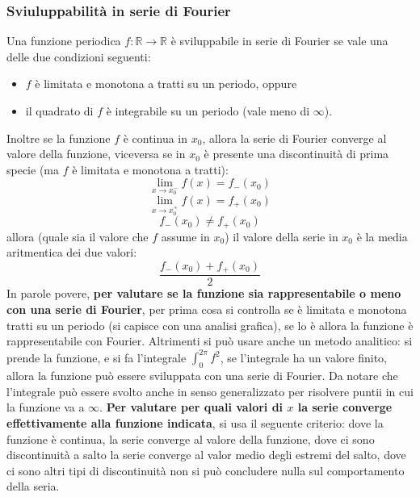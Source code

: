\subsubsection{Sviuluppabilità in serie di Fourier}
Una funzione periodica $f: \mathbb{R} \rightarrow  \mathbb{R}$ è sviluppabile in serie di Fourier se vale una delle due condizioni seguenti:
\begin{itemize}
    \item $f$ è limitata e monotona a tratti su un periodo, oppure
    \item il quadrato di $f$ è integrabile su un periodo (vale meno di $\infty$).
\end{itemize}
Inoltre se la funzione $f$ è continua in $x_0$, allora la serie di Fourier converge al valore della funzione, viceversa se in $x_0$ è presente una discontinuità di prima specie (ma $f$ è limitata e monotona a tratti):
\[
    \lim_{x\rightarrow x_0^-} f(x) = f_-(x_0)
\]
\[
    \lim_{x\rightarrow x_0^+} f(x) = f_+(x_0)
\]
\[
    f_-(x_0) \neq f_+(x_0)
\]
allora (quale sia il valore che $f$ assume in $x_0$) il valore della serie in $x_0$ è la media aritmentica dei due valori:
\[
    \frac{f_-(x_0) + f_+(x_0)}{2}
\]
\newline
In parole povere, \textbf{per valutare se la funzione sia rappresentabile o meno con una serie di Fourier}, per prima cosa si controlla se è limitata e monotona tratti su un periodo (si capisce con una analisi grafica), se lo è allora la funzione è rappresentabile con Fourier. Altrimenti si può usare anche un metodo analitico: si prende la funzione, e si fa l'integrale $\int_{0}^{2\pi} f^2$, se l'integrale ha un valore finito, allora la funzione può essere sviluppata con una serie di Fourier. Da notare che l'integrale può essere svolto anche in senso generalizzato per risolvere puntii in cui la funzione va a $\infty$.\newline
\textbf{Per valutare per quali valori di $x$ la serie converge effettivamente alla funzione indicata}, si usa il seguente criterio: dove la funzione è continua, la serie converge al valore della funzione, dove ci sono discontinuità a salto la serie converge al valor medio degli estremi del salto, dove ci sono altri tipi di discontinuità non si può concludere nulla sul comportamento della seria.
